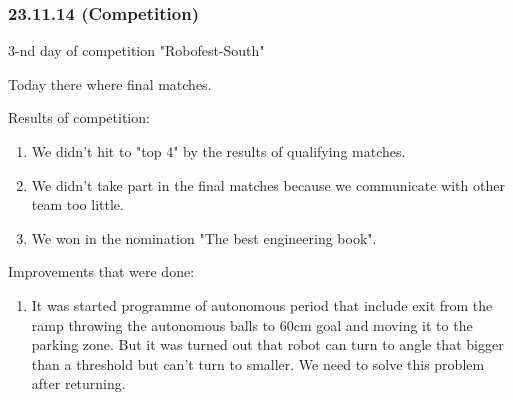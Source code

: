 \subsubsection{23.11.14 (Competition)}
\begin{center}
	 3-nd day of competition "Robofest-South"
\end{center}
Today there where final matches.

Results of competition:
\begin{enumerate}
	\item We didn't hit to "top 4" by the results of qualifying matches.
	
	\item We didn't take part in the final matches because we communicate with other team too little.
	
	\item We won in the nomination "The best engineering book".
\end{enumerate}

Improvements that were done:
\begin{enumerate}
	\item It was started programme of autonomous period that include exit from the ramp throwing the autonomous balls to 60cm goal and moving it to the parking zone. But it was turned out that robot can turn to angle that bigger than a threshold but can't turn to smaller. We need to solve this problem after returning.
\end{enumerate}

